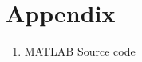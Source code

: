 \documentclass[Main]{subfiles}
\begin{document}
\chapter{Appendix}


\begin{enumerate}
\item MATLAB Source code \label{App:SourceCode}
\end{enumerate}
\end{document}
